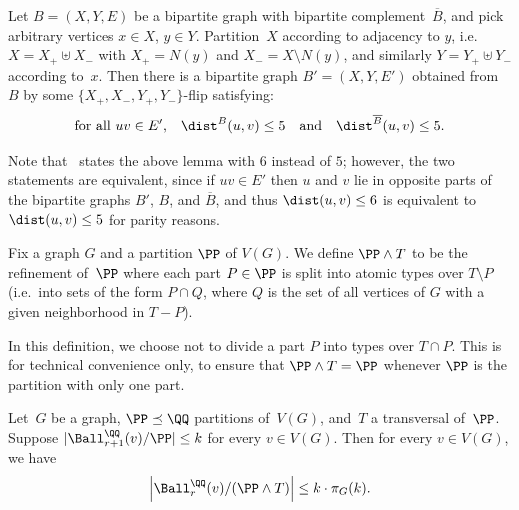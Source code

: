 \begin{lemma}\label{lem:bipartite-informal-lemma}
  Let $B = (X,Y,E)$ be a bipartite graph with bipartite complement~$\overline{B}$, and pick arbitrary vertices $x \in X$, $y \in Y$.
  Partition~$X$ according to adjacency to $y$,
  i.e.\ $X = X_+ \uplus X_-$ with $X_+ = N(y)$ and $X_- = X \setminus N(y)$,
  and similarly $Y = Y_+ \uplus Y_-$ according to~$x$.
  Then there is a bipartite graph $B' = (X,Y,E')$ obtained from $B$ by some $\{X_+,X_-,Y_+,Y_-\}$-flip satisfying:
  \[ \text{for all $uv \in E'$,} \quad \dist^B(u,v) \le 5 \quad \text{and} \quad \dist^{\overline{B}}(u,v) \le 5. \]
\end{lemma}
Note that~\cite[Lemma~A.3]{drabik2026variants} states the above lemma with $6$ instead of $5$; however, the two statements are equivalent, since
if $uv\in E'$ then $u$ and $v$ lie in opposite parts of the bipartite graphs $B'$, $B$, and $\overline{B}$, and thus $\dist(u,v)\le 6$ is equivalent to $\dist(u,v)\le 5$ for parity reasons.

\begin{definition}
    Fix a graph $G$ and a partition $\PP$ of $V(G)$. We define $\PP \wedge T$ to be the refinement of~$\PP$ where each part $P \in \PP$ is split into atomic types over $T \setminus P$
    (i.e.\ into sets of the form $P\cap Q$, where $Q$ is the set of all vertices of $G$ with a given neighborhood in $T-P$).
\end{definition}

\noindent In this definition, we choose not to divide a part $P$ into types over $T \cap P$. This is for technical convenience only, to ensure that $\PP \wedge T = \PP$ whenever $\PP$ is the partition with only one part.

\begin{lemma}\label{lem:transversalRefinement}
	Let~$G $ be a graph, $\PP\preceq\QQ$ partitions of~$V(G)$, and~$T$ a transversal of~$\PP$.
  Suppose $|\Ball^\QQ_{r+1}(v)/\PP| \le k$ for every $v\in V(G)$.
  Then for every $v\in V(G)$, we have
  \[
    \left|\Ball^{\QQ}_r(v)/(\PP \wedge T)\right|\le k \cdot \pi_G(k).
  \]
\end{lemma}


